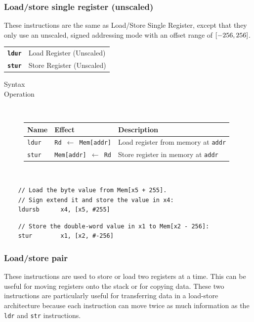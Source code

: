 \subsubsection{Load/store single register (unscaled)}
These instructions are the same as Load/Store Single Register, except that they only use an
unscaled, signed addressing mode with an offset range of $\intcc{-256,256}$. 
\begin{table}[h!]
	\begin{tabular}{ll}
		\texttt{\bf ldur} & Load Register (Unscaled) \\
		\texttt{\bf stur} & Store Register (Unscaled)
	\end{tabular}
\end{table}
\begin{description}
\item[Syntax] 
\item[Operation] \ \begin{table}[h!]
	\begin{tabular}{lll}
		\textbf{Name} & \textbf{Effect} & \textbf{Description} \\ \hline
		\texttt{ldur} & \texttt{Rd $\gets$ Mem[addr]} & Load register from memory at \texttt{addr} \\ \hline
		\texttt{stur} & \texttt{Mem[addr] $\gets$ Rd} & Store register in memory at \texttt{addr}
	\end{tabular}
\end{table}
\end{description}
\begin{example*}
\ \begin{lstlisting}
	// Load the byte value from Mem[x5 + 255]. 
	// Sign extend it and store the value in x4:
	ldursb		x4, [x5, #255]
\end{lstlisting}
\begin{lstlisting}
	// Store the double-word value in x1 to Mem[x2 - 256]:
	stur		x1, [x2, #-256]
\end{lstlisting}
\end{example*}

\subsubsection{Load/store pair}
These instructions are used to store or load two registers at a time. This can be useful for moving registers onto the stack or for copying data. These two instructions are particularly useful for transferring data in a load-store architecture because each instruction can move twice as much information as the \texttt{ldr} and \texttt{str} instructions.

